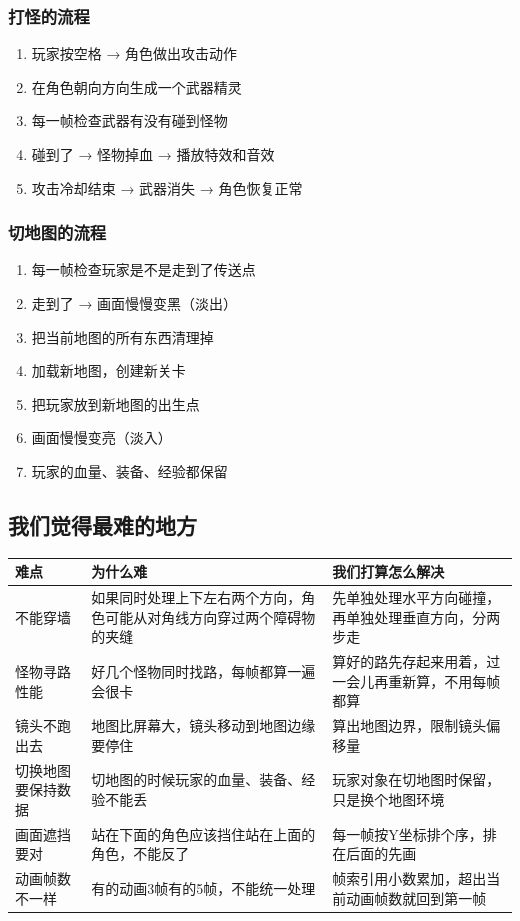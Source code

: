 \documentclass[12pt,a4paper]{article}
\begin{document}
\subsubsection{打怪的流程}

\begin{enumerate}[leftmargin=2em]
    \item 玩家按空格 → 角色做出攻击动作
    \item 在角色朝向方向生成一个武器精灵
    \item 每一帧检查武器有没有碰到怪物
    \item 碰到了 → 怪物掉血 → 播放特效和音效
    \item 攻击冷却结束 → 武器消失 → 角色恢复正常
\end{enumerate}

\subsubsection{切地图的流程}

\begin{enumerate}[leftmargin=2em]
    \item 每一帧检查玩家是不是走到了传送点
    \item 走到了 → 画面慢慢变黑（淡出）
    \item 把当前地图的所有东西清理掉
    \item 加载新地图，创建新关卡
    \item 把玩家放到新地图的出生点
    \item 画面慢慢变亮（淡入）
    \item 玩家的血量、装备、经验都保留
\end{enumerate}

\subsection{我们觉得最难的地方}

\begin{table}[htbp]
\centering
\renewcommand{\arraystretch}{1.4}
\begin{tabularx}{\textwidth}{p{2.5cm}p{5cm}p{5.5cm}}
\toprule
\textbf{难点} & \textbf{为什么难} & \textbf{我们打算怎么解决} \\
\midrule
不能穿墙 & 如果同时处理上下左右两个方向，角色可能从对角线方向穿过两个障碍物的夹缝 & 先单独处理水平方向碰撞，再单独处理垂直方向，分两步走 \\
怪物寻路性能 & 好几个怪物同时找路，每帧都算一遍会很卡 & 算好的路先存起来用着，过一会儿再重新算，不用每帧都算 \\
镜头不跑出去 & 地图比屏幕大，镜头移动到地图边缘要停住 & 算出地图边界，限制镜头偏移量 \\
切换地图要保持数据 & 切地图的时候玩家的血量、装备、经验不能丢 & 玩家对象在切地图时保留，只是换个地图环境 \\
画面遮挡要对 & 站在下面的角色应该挡住站在上面的角色，不能反了 & 每一帧按Y坐标排个序，排在后面的先画 \\
动画帧数不一样 & 有的动画3帧有的5帧，不能统一处理 & 帧索引用小数累加，超出当前动画帧数就回到第一帧 \\
\bottomrule
\end{tabularx}
\end{table}
\end{document}
